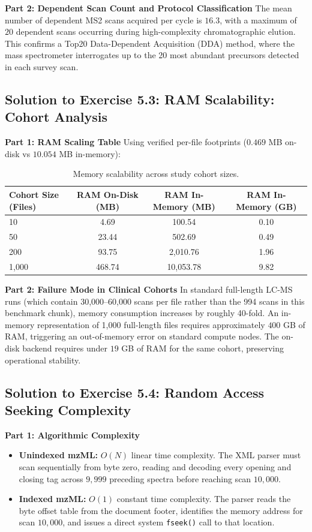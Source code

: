 \documentclass[11pt,twoside,openright]{book}
\begin{document}
\noindent\textbf{Part 2: Dependent Scan Count and Protocol Classification}\enspace
The mean number of dependent MS2 scans acquired per cycle is $16.3$, with a maximum of $20$ dependent scans occurring during high-complexity chromatographic elution. This confirms a Top20 Data-Dependent Acquisition (DDA) method, where the mass spectrometer interrogates up to the 20 most abundant precursors detected in each survey scan.

\subsection{Solution to Exercise 5.3: RAM Scalability: Cohort Analysis}
\noindent\textbf{Part 1: RAM Scaling Table}\enspace
Using verified per-file footprints ($0.469$ MB on-disk vs $10.054$ MB in-memory):
\begin{table}[htbp]
\centering
\caption{Memory scalability across study cohort sizes.}
\label{tab:ram_scalability_table}
\begin{tabular}{lccc}
\toprule
\textbf{Cohort Size (Files)} & \textbf{RAM On-Disk (MB)} & \textbf{RAM In-Memory (MB)} & \textbf{RAM In-Memory (GB)} \\
\midrule
10   & 4.69   & 100.54   & 0.10 \\
50   & 23.44  & 502.69   & 0.49 \\
200  & 93.75  & 2,010.76 & 1.96 \\
1,000 & 468.74 & 10,053.78 & 9.82 \\
\bottomrule
\end{tabular}
\end{table}

\noindent\textbf{Part 2: Failure Mode in Clinical Cohorts}\enspace
In standard full-length LC-MS runs (which contain 30,000--60,000 scans per file rather than the 994 scans in this benchmark chunk), memory consumption increases by roughly 40-fold. An in-memory representation of 1,000 full-length files requires approximately $400$ GB of RAM, triggering an out-of-memory error on standard compute nodes. The on-disk backend requires under $19$ GB of RAM for the same cohort, preserving operational stability.

\subsection{Solution to Exercise 5.4: Random Access Seeking Complexity}
\noindent\textbf{Part 1: Algorithmic Complexity}\enspace
\begin{itemize}
    \item \textbf{Unindexed mzML:} $O(N)$ linear time complexity. The XML parser must scan sequentially from byte zero, reading and decoding every opening and closing tag across $9,999$ preceding spectra before reaching scan $10,000$.
    \item \textbf{Indexed mzML:} $O(1)$ constant time complexity. The parser reads the byte offset table from the document footer, identifies the memory address for scan $10,000$, and issues a direct system \texttt{fseek()} call to that location.
\end{itemize}
\end{document}
